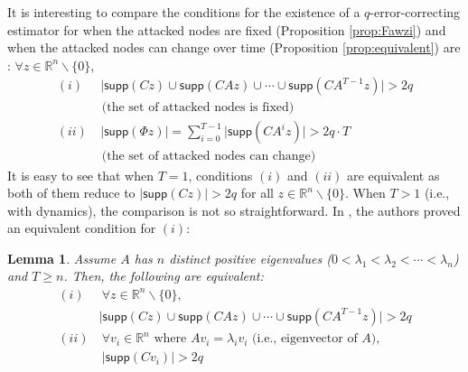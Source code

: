 \documentclass[twocolumn]{autart}    %
\newtheorem{Lem}{\bf{Lemma}}
\newcommand{\rev}[1]{{\normalsize{{{\color{blue}#1}}}}}
\begin{document}
It is interesting to compare the conditions for the existence of a $q$-error-correcting \rev{estimator} for when the attacked nodes are fixed (Proposition \ref{prop:Fawzi}) and when the attacked nodes can change over time (Proposition \ref{prop:equivalent}) are :
$\forall z \in \mathbb{R}^n\backslash \{0 \}$,
\begin{equation}
\begin{aligned}
(i) &~  \lvert \textsf{supp}(Cz) \cup \textsf{supp}(CAz) \cup \cdots \cup \textsf{supp}(CA^{T-1} z) \rvert > 2q  \\& \text{ (the set of attacked nodes is fixed)}\\
(ii) & ~ \lvert \textsf{supp} (\Phi z) \rvert 
     =  \sum_{i=0}^{T-1} \lvert \textsf{supp} (C A^i z) \rvert > 2 q \cdot T \\& \text{ (the set of attacked nodes can change)} 
	\label{eq:connection}
\end{aligned}
\end{equation}
It is easy to see that when $T=1$, conditions $(i)$ and $(ii)$ are equivalent as both of them reduce to $\lvert \textsf{supp} (Cz) \rvert > 2q$ for all $z \in \mathbb{R}^n\backslash \{0 \}$.
When $T>1$ (i.e., with dynamics), the comparison is not so straightforward. In \cite{Fawzi2014}, the authors proved an equivalent condition for $(i)$:
\vspace{-0.2cm}
\begin{Lem} \label{lem:distinct}
Assume $A$ has $n$ distinct positive eigenvalues ($0<\lambda_1 < \lambda_2 <\cdots < \lambda_n$) and $T \geq n$. Then, the following are equivalent:
\begin{equation}
\begin{aligned}
 (i) &~ \forall z \in \mathbb{R}^n \backslash \{0\},  \\& \lvert \textsf{supp}(Cz) \cup \textsf{supp}(CAz) \cup \cdots \cup \textsf{supp}(CA^{T-1} z) \rvert > 2q  \\
 (ii)  &~\forall v_i \in \mathbb{R}^n \text{ where }   Av_i = \lambda_i v_i \text{ (i.e., eigenvector of $A$)},\\& ~ \lvert \textsf{supp}(Cv_i) \rvert > 2q \nonumber
\label{eq:condition}
\end{aligned}
\end{equation}
\end{Lem}
\vspace{-0.4cm}
\end{document}

